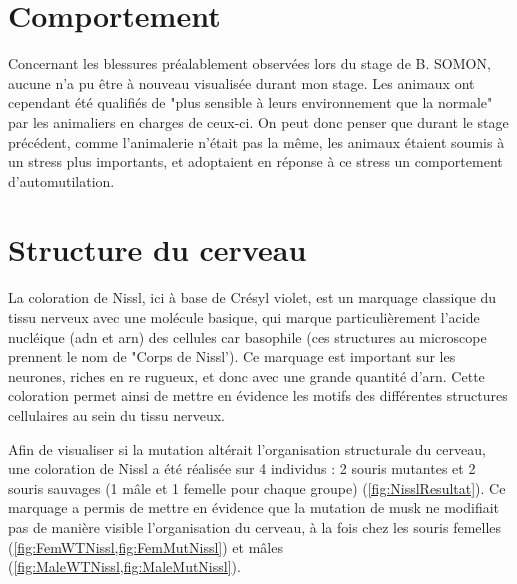 \section{Comportement}
\label{sec:Comportement}
	Concernant les blessures préalablement observées lors du stage de B. SOMON, aucune n'a pu être à nouveau visualisée durant mon stage. Les animaux ont cependant été qualifiés de "plus sensible à leurs environnement que la normale" par les animaliers en charges de ceux-ci. On peut donc penser que durant le stage précédent, comme l'animalerie n'était pas la même, les animaux étaient soumis à un stress plus importants, et adoptaient en réponse à ce stress un comportement d'automutilation.

\section{Structure du cerveau}
\label{sec:NisslResultat}
	La coloration de Nissl, ici à base de Crésyl violet, est un marquage classique du tissu nerveux avec une molécule basique, qui marque particulièrement l'acide nucléique (\acrshort{adn} et \acrshort{arn}) des cellules car basophile (ces structures au microscope prennent le nom de "Corps de Nissl'). Ce marquage est important sur les neurones, riches en \gls{re} rugueux, et donc avec une grande quantité d'\acrshort{arn}. Cette coloration permet ainsi de mettre en évidence les motifs des différentes structures cellulaires au sein du tissu nerveux.

	Afin de visualiser si la mutation \mcrd altérait l'organisation structurale du cerveau, une coloration de Nissl a été réalisée sur 4 individus : 2 souris mutantes et 2 souris sauvages (1 mâle et 1 femelle pour chaque groupe) (\cref{fig:NisslResultat}). Ce marquage a permis de mettre en évidence que la mutation de \gls{musk} ne modifiait pas de manière visible l'organisation du cerveau, à la fois chez les souris femelles (\cref{fig:FemWTNissl,fig:FemMutNissl}) et mâles (\cref{fig:MaleWTNissl,fig:MaleMutNissl}). 

